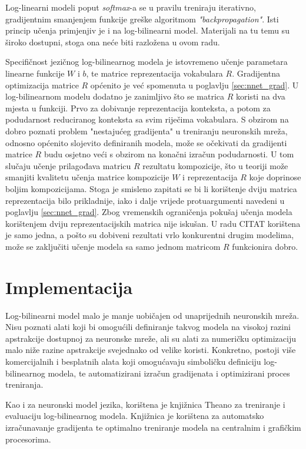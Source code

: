 \documentclass[times, utf8, diplomski, numeric]{fer}
\begin{document}
Log-linearni modeli poput \textit{softmax}-a se u pravilu treniraju iterativno, gradijentnim smanjenjem funkcije greške algoritmom \textit{"backpropagation"}. Isti princip učenja primjenjiv je i na log-bilinearni model. Materijali na tu temu su široko dostupni, stoga ona neće biti razložena u ovom radu.

Specifičnost jezičnog log-bilinearnog modela je istovremeno učenje parametara linearne funkcije $W$ i $b$, te matrice reprezentacija vokabulara $R$. Gradijentna optimizacija matrice $R$ općenito je već spomenuta u poglavlju \ref{sec:nnet_grad}. U log-bilinearnom modelu dodatno je zanimljivo što se matrica $R$ koristi na dva mjesta u funkciji. Prvo za dobivanje reprezentacija konteksta, a potom za podudarnost reduciranog konteksta sa svim riječima vokabulara. S obzirom na dobro poznati problem "nestajućeg gradijenta" u treniranju neuronskih mreža, odnosno općenito slojevito definiranih modela, može se očekivati da gradijenti matrice $R$ budu osjetno veći s obzirom na konačni izračun podudarnosti. U tom slučaju učenje prilagođava matricu $R$ rezultatu kompozicije, što u teoriji može smanjiti kvalitetu učenja matrice kompozicije $W$ i reprezentacija $R$ koje doprinose boljim kompozicijama. Stoga je smisleno zapitati se bi li korištenje dviju matrica reprezentacija bilo prikladnije, iako i dalje vrijede protuargumenti navedeni u poglavlju \ref{sec:nnet_grad}. Zbog vremenskih ograničenja pokušaj učenja modela korištenjem dviju reprezentacijskih matrica nije iskušan. U radu CITAT korištena je samo jedna, a pošto su dobiveni rezultati  vrlo konkurentni drugim modelima, može se zaključiti učenje modela sa samo jednom matricom $R$ funkcionira dobro.

\section{Implementacija}

Log-bilinearni model malo je manje uobičajen od unaprijednih neuronskih mreža. Nisu poznati alati koji bi omogućili definiranje takvog modela na visokoj razini apstrakcije dostupnoj za neuronske mreže, ali su alati za numeričku optimizaciju malo niže razine apstrakcije svejednako od velike koristi. Konkretno, postoji više komercijalnih i besplatnih alata koji omogućavaju simboličku definiciju log-bilinearnog modela, te automatizirani izračun gradijenata i optimizirani proces treniranja.

Kao i za neuronski model jezika, korištena je knjižnica Theano za treniranje i evaluaciju log-bilinearnog modela. Knjižnica je korištena za automatsko izračunavanje gradijenta te optimalno treniranje modela na centralnim i grafičkim procesorima.
\end{document}
